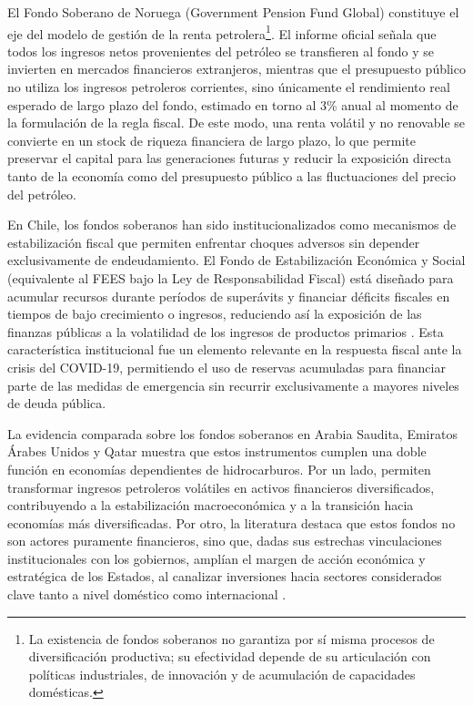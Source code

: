 \documentclass[../../PTFM.tex]{subfiles}
\begin{document}
	El Fondo Soberano de Noruega (Government Pension Fund Global) constituye el eje del modelo de gestión de la renta petrolera\footnote{La existencia de fondos soberanos no garantiza por sí misma procesos de diversificación productiva; su efectividad depende de su articulación con políticas industriales, de innovación y de acumulación de capacidades domésticas.}. El informe oficial \textcite{NOU2015} señala que todos los ingresos netos provenientes del petróleo se transfieren al fondo y se invierten en mercados financieros extranjeros, mientras que el presupuesto público no utiliza los ingresos petroleros corrientes, sino únicamente el rendimiento real esperado de largo plazo del fondo, estimado en torno al 3\% anual al momento de la formulación de la regla fiscal. De este modo, una renta volátil y no renovable se convierte en un stock de riqueza financiera de largo plazo, lo que permite preservar el capital para las generaciones futuras y reducir la exposición directa tanto de la economía como del presupuesto público a las fluctuaciones del precio del petróleo.
	
	En Chile, los fondos soberanos han sido institucionalizados como mecanismos de estabilización fiscal que permiten enfrentar choques adversos sin depender exclusivamente de endeudamiento. El Fondo de Estabilización Económica y Social (equivalente al FEES bajo la Ley de Responsabilidad Fiscal) está diseñado para acumular recursos durante períodos de superávits y financiar déficits fiscales en tiempos de bajo crecimiento o ingresos, reduciendo así la exposición de las finanzas públicas a la volatilidad de los ingresos de productos primarios \parencite{OECD2020}. Esta característica institucional fue un elemento relevante en la respuesta fiscal ante la crisis del COVID-19, permitiendo el uso de reservas acumuladas para financiar parte de las medidas de emergencia sin recurrir exclusivamente a mayores niveles de deuda pública. 
	
	La evidencia comparada sobre los fondos soberanos en Arabia Saudita, Emiratos Árabes Unidos y Qatar muestra que estos instrumentos cumplen una doble función en economías dependientes de hidrocarburos. Por un lado, permiten transformar ingresos petroleros volátiles en activos financieros diversificados, contribuyendo a la estabilización macroeconómica y a la transición hacia economías más diversificadas. Por otro, la literatura destaca que estos fondos no son actores puramente financieros, sino que, dadas sus estrechas vinculaciones institucionales con los gobiernos, amplían el margen de acción económica y estratégica de los Estados, al canalizar inversiones hacia sectores considerados clave tanto a nivel doméstico como internacional \parencite{Roll2026}.
	
\end{document}
